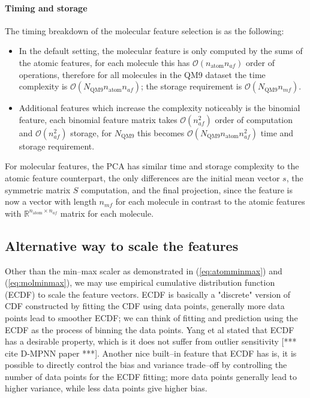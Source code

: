 \documentclass[12pt]{article}
\def\att{                    %
        \marginpar[ \hspace*{\fill} \raisebox{-0.2em}{\rule{2mm}{1.2em}} ]
        {\raisebox{-0.2em}{\rule{2mm}{1.2em}} }
        }
\def\at#1{[*** \att #1 ***]}  %
\begin{document}
\paragraph{Timing and storage}
The timing breakdown of the molecular feature selection is as the following:
\begin{itemize}
	\item In the default setting, the molecular feature is only computed by the sums of the atomic features, for each molecule this has $\mathcal{O}(n_\text{atom} n_{af})$ order of operations, therefore for all molecules in the QM9 dataset the time complexity is $\mathcal{O}(N_\text{QM9}n_\text{atom} n_{af})$; the storage requirement is $\mathcal{O}(N_\text{QM9}n_{mf})$. 
	\item Additional features which increase the complexity noticeably is the binomial feature, each binomial feature matrix takes $\mathcal{O}(n^2_{af})$ order of computation and $\mathcal{O}(n^2_{af})$ storage, for $N_\text{QM9}$ this becomes $\mathcal{O}(N_\text{QM9}n_\text{atom}n^2_{af})$ time and storage requirement.
\end{itemize}
For molecular features, the PCA has similar time and storage complexity to the atomic feature counterpart, the only differences are the initial mean vector $s$, the symmetric matrix $S$ computation, and the final projection, since the feature is now a vector with length $n_{mf}$ for each molecule in contrast to the atomic features with $\mathbb{R}^{n_\text{atom} \times n_{af}}$ matrix for each molecule.

\subsection{Alternative way to scale the features}
Other than the min--max scaler as demonstrated in (\ref{eq:atomminmax}) and (\ref{eq:molminmax}), we may use empirical cumulative distribution function (ECDF) to scale the feature vectors. 
ECDF is basically a "discrete" version of CDF constructed by fitting the CDF using data points, generally more data points lead to smoother ECDF; we can think of fitting and prediction using the ECDF as the process of binning the data points.
Yang et al stated that ECDF has a desirable property, which is it does not suffer from outlier sensitivity \at{cite D-MPNN paper}.
Another nice built--in feature that ECDF has is, it is possible to directly control the bias and variance trade--off by controlling the number of data points for the ECDF fitting; more data points generally lead to higher variance, while less data points give higher bias. 
\end{document}
